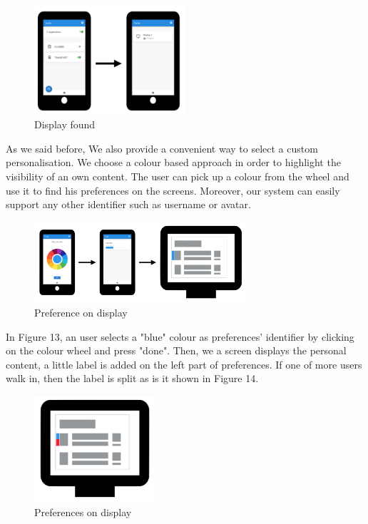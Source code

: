 \documentclass[]{usiinfbachelorproject}
\begin{document}
\begin{figure}[H]
\centering
\includegraphics[width=0.5\textwidth]{./images/smartphone_displays}
\caption{Display found}
\end{figure}
As we said before, We also provide a convenient way to select a custom personalisation. We choose a colour based approach in order to highlight the visibility of an own content. The user can pick up a colour from the wheel and use it to find his preferences on the screens. Moreover, our system can easily support any other identifier such as username or avatar.
\begin{figure}[H]
  \centering
  \includegraphics[width=0.7\textwidth]{./images/smartphone_color_preference}
  \caption{Preference on display}
\end{figure}
In Figure 13, an user selects a "blue" colour as preferences' identifier by clicking on the colour wheel and press "done". Then, we a screen displays the personal content, a little label is added on the left part of preferences. If one of more users walk in, then the label is split as is it shown in Figure 14.
\begin{figure}[H]
  \centering
\includegraphics[width=0.4\textwidth]{./images/preference_colour/preference_splited}
  \caption{Preferences on display}

\end{figure}
\newpage
\end{document}
